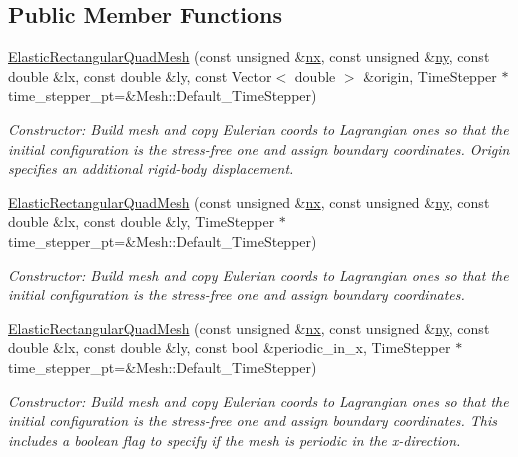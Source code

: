 \subsection*{Public Member Functions}
\begin{DoxyCompactItemize}
\item 
\hyperlink{classoomph_1_1ElasticRectangularQuadMesh_aad1e395c3f314854b68c4f1df9256230}{Elastic\+Rectangular\+Quad\+Mesh} (const unsigned \&\hyperlink{classoomph_1_1RectangularQuadMesh_abfef93d6322886cdce14a437186e4821}{nx}, const unsigned \&\hyperlink{classoomph_1_1RectangularQuadMesh_a86d76a55eb7c4e8bca9b74d23c8b0412}{ny}, const double \&lx, const double \&ly, const Vector$<$ double $>$ \&origin, Time\+Stepper $\ast$time\+\_\+stepper\+\_\+pt=\&Mesh\+::\+Default\+\_\+\+Time\+Stepper)
\begin{DoxyCompactList}\small\item\em Constructor\+: Build mesh and copy Eulerian coords to Lagrangian ones so that the initial configuration is the stress-\/free one and assign boundary coordinates. Origin specifies an additional rigid-\/body displacement. \end{DoxyCompactList}\item 
\hyperlink{classoomph_1_1ElasticRectangularQuadMesh_a57b701739dcc5c643a1a9bae94a4b7d8}{Elastic\+Rectangular\+Quad\+Mesh} (const unsigned \&\hyperlink{classoomph_1_1RectangularQuadMesh_abfef93d6322886cdce14a437186e4821}{nx}, const unsigned \&\hyperlink{classoomph_1_1RectangularQuadMesh_a86d76a55eb7c4e8bca9b74d23c8b0412}{ny}, const double \&lx, const double \&ly, Time\+Stepper $\ast$time\+\_\+stepper\+\_\+pt=\&Mesh\+::\+Default\+\_\+\+Time\+Stepper)
\begin{DoxyCompactList}\small\item\em Constructor\+: Build mesh and copy Eulerian coords to Lagrangian ones so that the initial configuration is the stress-\/free one and assign boundary coordinates. \end{DoxyCompactList}\item 
\hyperlink{classoomph_1_1ElasticRectangularQuadMesh_a3865acefe6df1aac212d8306f516ebd1}{Elastic\+Rectangular\+Quad\+Mesh} (const unsigned \&\hyperlink{classoomph_1_1RectangularQuadMesh_abfef93d6322886cdce14a437186e4821}{nx}, const unsigned \&\hyperlink{classoomph_1_1RectangularQuadMesh_a86d76a55eb7c4e8bca9b74d23c8b0412}{ny}, const double \&lx, const double \&ly, const bool \&periodic\+\_\+in\+\_\+x, Time\+Stepper $\ast$time\+\_\+stepper\+\_\+pt=\&Mesh\+::\+Default\+\_\+\+Time\+Stepper)
\begin{DoxyCompactList}\small\item\em Constructor\+: Build mesh and copy Eulerian coords to Lagrangian ones so that the initial configuration is the stress-\/free one and assign boundary coordinates. This includes a boolean flag to specify if the mesh is periodic in the x-\/direction. \end{DoxyCompactList}\end{DoxyCompactItemize}
